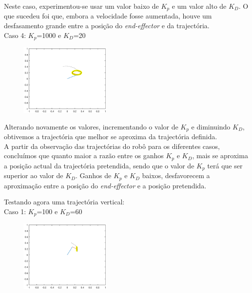 \documentclass[a4paper,twocolumn,final,11pt]{article}
\begin{document}
Neste caso, experimentou-se usar um valor baixo de $K_p$ e um valor alto de $K_D$. O que sucedeu foi que, embora a velocidade fosse aumentada, houve um desfasamento grande entre a posição do \textit{end-effector} e da trajectória.
\\

Caso 4: $K_p$=1000 e $K_D$=20

\begin{figure}[H]
	\centering
	\includegraphics[width=0.4\textwidth]{7pd_ganhos_1000_20.eps}
	\caption{}
  \label{}
\end{figure}

Alterando novamente os valores, incrementando o valor de $K_p$ e diminuindo $K_D$, obtivemos a trajectória que melhor se aproxima da trajectória definida. 
\\
 
A partir da observação das trajectórias do robô para os diferentes casos, concluímos que quanto maior a razão entre os ganhos $K_p$ e $K_D$, mais se aproxima a posição actual da trajectória pretendida, sendo que o valor de $K_p$ terá que ser superior ao valor de $K_D$. 
Ganhos de $K_p$ e $K_D$ baixos, desfavorecem a aproximação entre a posição do \textit{end-effector} e a posição pretendida.
\linebreak

Testando agora uma trajectória vertical:
\\

Caso 1:  $K_p$=100 e $K_D$=60

\begin{figure}[H]
	\centering
	\includegraphics[width=0.4\textwidth]{7_vertical_pd_ganhos_100_60.eps}
	\caption{}
  \label{}
\end{figure}
\end{document}

